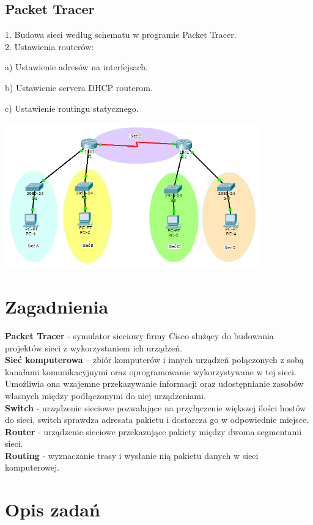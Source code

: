 \documentclass[12pt,a4paper]{article}
\begin{document}
\subsection{Packet Tracer}
1. Budowa sieci według schematu w programie Packet Tracer. \\
2. Ustawienia routerów:

a) Ustawienie adresów na interfejsach.

b) Ustawienie servera DHCP routerom.

c) Ustawienie routingu statycznego.
\begin{center}
\includegraphics[width=11cm]{schemat}
\end{center}

\section{Zagadnienia}
{\bf Packet Tracer} - symulator sieciowy firmy Cisco służący do budowania projektów sieci z wykorzystaniem ich urządzeń.\\
{\bf Sieć komputerowa} – zbiór komputerów i innych urządzeń połączonych z sobą kanałami
komunikacyjnymi oraz oprogramowanie wykorzystywane w tej sieci. Umożliwia ona wzajemne
przekazywanie informacji oraz udostępnianie zasobów własnych między podłączonymi do niej
urządzeniami. \\
{\bf Switch} - urządzenie sieciowe pozwalające na przyłączenie większej ilości hostów do sieci, switch sprawdza adresata pakietu i dostarcza go w odpowiednie miejsce.\\
{\bf Router} - urządzenie sieciowe przekazujące pakiety między dwoma segmentami sieci.\\
{\bf Routing} - wyznaczanie trasy i wysłanie nią pakietu danych w sieci komputerowej. \\

\section{Opis zadań}
\end{document}
